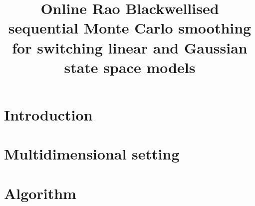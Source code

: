 




\title{Online Rao Blackwellised sequential Monte Carlo smoothing for switching linear and Gaussian state space models}

\lhead{}

\maketitle

\begin{abstract}

\end{abstract}

\section{Introduction}
\label{sec:introduction}


\section{Multidimensional setting}
\label{sec:multidimensional}


\section{Algorithm}
\label{sec:alg}




 